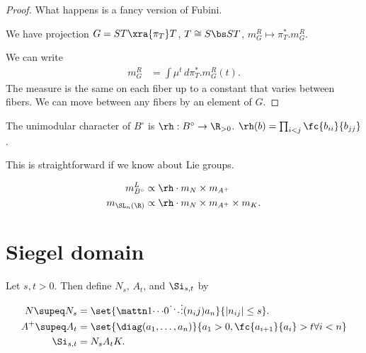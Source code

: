 \begin{proof}
What happens is a fancy version of Fubini.

We have projection $G=ST\xra{\pi_T} T$, $T\cong S\bs ST$, $m_G^R \mapsto \pi_T^*.m_G^R$. 

We can write
\begin{align}
m_G^R &=\int \mu^t\,d\pi_T^* . m_G^R(t). 
\end{align}
The measure is the same on each fiber up to a constant that varies between fibers.
We can move between any fibers by  an element of $G$. 
\end{proof}

\begin{pr}
The unimodular character of $B^\circ$ is
$\rh:B^\circ \to \R_{>0}$. $\rh(b) = \prod_{i<j} \fc{b_{ii}}{b_{jj}}$. 
\end{pr}
This is straightforward if we know about Lie groups. 
\begin{cor}
\begin{align}
m_{B^\circ}^L&\propto \rh \cdot m_N\times m_{A^+}\\
m_{\SL_n(\R)} &\propto \rh \cdot m_{N} \times m_{A^+} \times m_K.
\end{align}
\end{cor}

\section{Siegel domain}

\begin{df}
Let $s,t>0$. Then define $N_s$, $A_t$, and $\Si_{s,t}$ by
\begin{align}
N\supeq N_s &= \set{\mattn 1{\cdots}{0}{}{\ddots}{\vdots}{(n_ij)}{}{a_n}}{|n_{ij}|\le s}.\\
A^+ \supeq A_t 
&= \set{\diag(a_1,\ldots, a_n)}{a_1>0,\fc{a_{i+1}}{a_i} > t\forall i<n}\\
\Si_{s,t} &= N_s A_tK.
\end{align}
\end{df}

